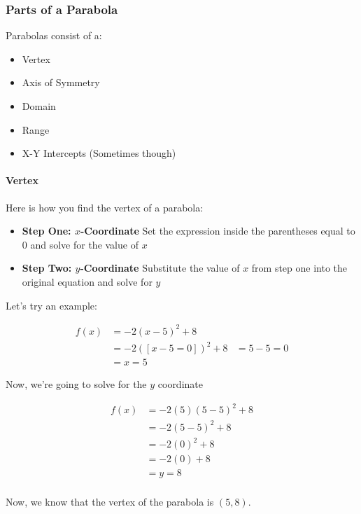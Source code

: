 
\subsubsection*{Parts of a Parabola}

Parabolas consist of a:

\begin{itemize}
    \item Vertex
    \item Axis of Symmetry
    \item Domain
    \item Range
    \item X-Y Intercepts (Sometimes though)
\end{itemize}

\paragraph{Vertex} Here is how you find the vertex of a parabola:

\begin{itemize}
    \item \textbf{Step One: $x$-Coordinate} Set the expression inside the parentheses equal to $0$ and solve for the value of $x$
    \item \textbf{Step Two: $y$-Coordinate} Substitute the value of $x$ from step one into the original equation and solve for $y$
\end{itemize}

Let's try an example:

\begin{example}[Given the equation $f(x) = -2(x - 5)^2 + 8$, find the $(x,y)$ coordinate of the vertex]
    \begin{align}
        f(x) &= -2(x - 5)^2 + 8 \\
             &= -2([x - 5 = 0])^2 + 8
             &= 5 - 5 = 0 \\
             &= x = 5
    \end{align}
    
    Now, we're going to solve for the $y$ coordinate
    
    \begin{align}
        f(x) &= -2(5)(5 - 5)^2 + 8 \\
             &= -2(5 - 5)^2 + 8 \\
             &= -2(0)^2 + 8 \\
             &= -2(0) + 8 \\
             &= y = 8 \\
    \end{align}
    
    Now, we know that the vertex of the parabola is $(5, 8)$.
\end{example}

